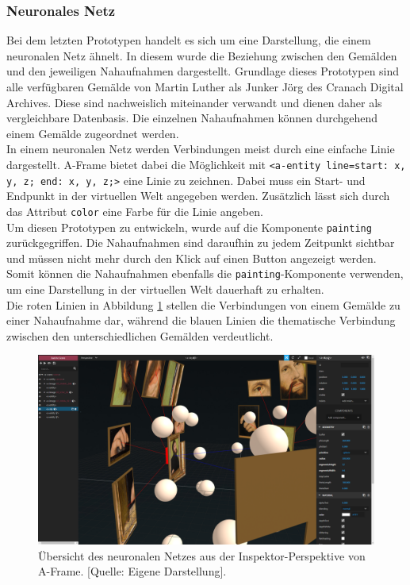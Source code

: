 \documentclass[a4paper,12pt,oneside]{article}
\begin{document}
      \subsubsection{Neuronales Netz}
        Bei dem letzten Prototypen handelt es sich um eine Darstellung, die
        einem neuronalen Netz ähnelt. In diesem wurde die Beziehung
        zwischen den Gemälden und den jeweiligen Nahaufnahmen dargestellt.
        Grundlage dieses Prototypen sind alle verfügbaren
        Gemälde von Martin Luther als Junker Jörg des Cranach Digital
        Archives. Diese sind nachweislich miteinander verwandt und 
        dienen daher als vergleichbare Datenbasis.
        Die einzelnen Nahaufnahmen können durchgehend einem 
        Gemälde zugeordnet werden. \\
        In einem neuronalen Netz werden Verbindungen meist durch eine
        einfache Linie dargestellt. A-Frame bietet dabei die Möglichkeit
        mit \texttt{<a-entity line=\dq start: x, y, z; end: x, y, z;\dq{}>} eine
        Linie zu zeichnen. Dabei muss ein Start- und Endpunkt in der
        virtuellen Welt angegeben werden. Zusätzlich lässt sich durch
        das Attribut \texttt{color} eine Farbe für die Linie angeben. \\
        Um diesen Prototypen zu entwickeln, wurde auf die Komponente
        \texttt{painting} zurückgegriffen. Die Nahaufnahmen
        sind daraufhin zu jedem Zeitpunkt sichtbar und müssen nicht mehr
        durch den Klick auf einen Button angezeigt werden. \\
        Somit
        können die Nahaufnahmen ebenfalls die \texttt{painting}-Komponente
        verwenden, um eine Darstellung in der virtuellen Welt dauerhaft
        zu erhalten. \\
        Die roten Linien in Abbildung \ref{fig:neural-network1} 
        stellen die Verbindungen von einem Gemälde zu
        einer Nahaufnahme dar, während die blauen Linien die thematische
        Verbindung zwischen den unterschiedlichen Gemälden verdeutlicht. 
        \begin{figure}[h]
          \centering
          \includegraphics[scale=0.3]{img/coding/neural-network1.png}
          \caption[Übersicht des neuronalen Netzes aus der Inspektor-Perspektive von A-Frame.]{Übersicht des neuronalen Netzes aus der Inspektor-Perspektive von A-Frame. [Quelle: Eigene Darstellung].}
          \label{fig:neural-network1}
        \end{figure} \\ \\ \\
\end{document}
